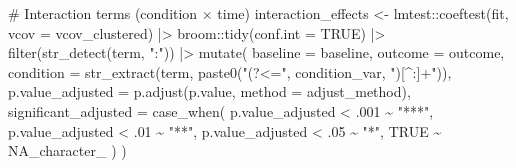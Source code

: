 \documentclass[
  letterpaper,
  DIV=11,
  numbers=noendperiod]{scrartcl}
\newenvironment{Shaded}{\begin{snugshade}}{\end{snugshade}}
\newcommand{\AttributeTok}[1]{\textcolor[rgb]{0.40,0.45,0.13}{#1}}
\newcommand{\CommentTok}[1]{\textcolor[rgb]{0.37,0.37,0.37}{#1}}
\newcommand{\ConstantTok}[1]{\textcolor[rgb]{0.56,0.35,0.01}{#1}}
\newcommand{\DecValTok}[1]{\textcolor[rgb]{0.68,0.00,0.00}{#1}}
\newcommand{\FunctionTok}[1]{\textcolor[rgb]{0.28,0.35,0.67}{#1}}
\newcommand{\NormalTok}[1]{\textcolor[rgb]{0.00,0.23,0.31}{#1}}
\newcommand{\OtherTok}[1]{\textcolor[rgb]{0.00,0.23,0.31}{#1}}
\newcommand{\SpecialCharTok}[1]{\textcolor[rgb]{0.37,0.37,0.37}{#1}}
\newcommand{\StringTok}[1]{\textcolor[rgb]{0.13,0.47,0.30}{#1}}
\begin{document}
\begin{Shaded}
\begin{Highlighting}[]
  \CommentTok{\# Interaction terms (condition × time)}
\NormalTok{  interaction\_effects }\OtherTok{\textless{}{-}}\NormalTok{ lmtest}\SpecialCharTok{::}\FunctionTok{coeftest}\NormalTok{(fit, }\AttributeTok{vcov =}\NormalTok{ vcov\_clustered) }\SpecialCharTok{|\textgreater{}}
\NormalTok{    broom}\SpecialCharTok{::}\FunctionTok{tidy}\NormalTok{(}\AttributeTok{conf.int =} \ConstantTok{TRUE}\NormalTok{) }\SpecialCharTok{|\textgreater{}}
    \FunctionTok{filter}\NormalTok{(}\FunctionTok{str\_detect}\NormalTok{(term, }\StringTok{":"}\NormalTok{)) }\SpecialCharTok{|\textgreater{}}
    \FunctionTok{mutate}\NormalTok{(}
      \AttributeTok{baseline             =}\NormalTok{ baseline,}
      \AttributeTok{outcome              =}\NormalTok{ outcome,}
      \AttributeTok{condition            =} \FunctionTok{str\_extract}\NormalTok{(term, }\FunctionTok{paste0}\NormalTok{(}\StringTok{"(?\textless{}="}\NormalTok{, condition\_var, }\StringTok{")[\^{}:]+"}\NormalTok{)),}
      \AttributeTok{p.value\_adjusted     =} \FunctionTok{p.adjust}\NormalTok{(p.value, }\AttributeTok{method =}\NormalTok{ adjust\_method),}
      \AttributeTok{significant\_adjusted =} \FunctionTok{case\_when}\NormalTok{(}
\NormalTok{        p.value\_adjusted }\SpecialCharTok{\textless{}}\NormalTok{ .}\DecValTok{001} \SpecialCharTok{\textasciitilde{}} \StringTok{"***"}\NormalTok{,}
\NormalTok{        p.value\_adjusted }\SpecialCharTok{\textless{}}\NormalTok{ .}\DecValTok{01}  \SpecialCharTok{\textasciitilde{}} \StringTok{"**"}\NormalTok{,}
\NormalTok{        p.value\_adjusted }\SpecialCharTok{\textless{}}\NormalTok{ .}\DecValTok{05}  \SpecialCharTok{\textasciitilde{}} \StringTok{"*"}\NormalTok{,}
        \ConstantTok{TRUE}                    \SpecialCharTok{\textasciitilde{}} \ConstantTok{NA\_character\_}
\NormalTok{      )}
\NormalTok{    )}
  

\end{Highlighting}
\end{Shaded}
\end{document}
